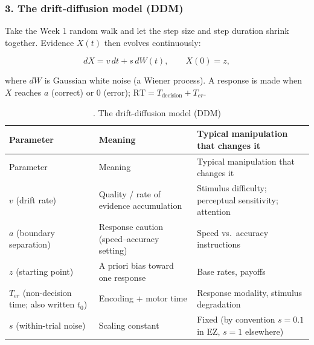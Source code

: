 \subsubsection{3. The drift-diffusion model (DDM)}

Take the Week 1 random walk and let the step size and step duration
shrink together. Evidence \(X(t)\) then evolves continuously:

\[
dX = v\,dt + s\,dW(t), \qquad X(0) = z,
\]

where \(dW\) is Gaussian white noise (a Wiener process). A response is
made when \(X\) reaches \(a\) (correct) or \(0\) (error);
\(\mathrm{RT} = T_{\text{decision}} + T_{er}\).

\begin{longtable}[]{@{}
  >{\raggedright\arraybackslash}p{}
  >{\raggedright\arraybackslash}p{}
  >{\raggedright\arraybackslash}p{}@{}}
\caption{. The drift-diffusion model (DDM)}\tabularnewline
\toprule\noalign{}
\begin{minipage}[b]{\linewidth}\raggedright
Parameter
\end{minipage} & \begin{minipage}[b]{\linewidth}\raggedright
Meaning
\end{minipage} & \begin{minipage}[b]{\linewidth}\raggedright
Typical manipulation that changes it
\end{minipage} \\
\midrule\noalign{}
\endfirsthead
\toprule\noalign{}
\begin{minipage}[b]{\linewidth}\raggedright
Parameter
\end{minipage} & \begin{minipage}[b]{\linewidth}\raggedright
Meaning
\end{minipage} & \begin{minipage}[b]{\linewidth}\raggedright
Typical manipulation that changes it
\end{minipage} \\
\midrule\noalign{}
\endhead
\bottomrule\noalign{}
\endlastfoot
\(v\) (drift rate) & Quality / rate of evidence accumulation & Stimulus
difficulty; perceptual sensitivity; attention \\
\(a\) (boundary separation) & Response caution (speed--accuracy setting)
& Speed vs.~accuracy instructions \\
\(z\) (starting point) & A priori bias toward one response & Base rates,
payoffs \\
\(T_{er}\) (non-decision time; also written \(t_0\)) & Encoding + motor
time & Response modality, stimulus degradation \\
\(s\) (within-trial noise) & Scaling constant & Fixed (by convention
\(s = 0.1\) in EZ, \(s = 1\) elsewhere) \\
\end{longtable}

